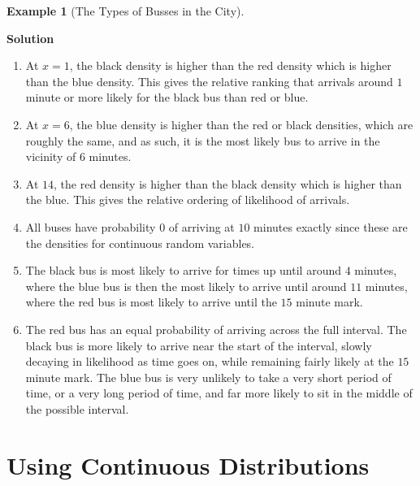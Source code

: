 \documentclass[
  letterpaper,
  DIV=11,
  numbers=noendperiod]{scrreprt}
\providecommand{\tightlist}{%
  \setlength{\itemsep}{0pt}\setlength{\parskip}{0pt}}\usepackage{longtable,booktabs,array}
\theoremstyle{definition}
\theoremstyle{definition}
\newtheorem{example}{Example}[chapter]
\theoremstyle{definition}
\theoremstyle{remark}
\begin{document}
\begin{example}[The Types of Busses in the
City]
\begin{tcolorbox}[enhanced jigsaw, colback=white, colframe=quarto-callout-color-frame, arc=.35mm, leftrule=.75mm, rightrule=.15mm, opacityback=0, breakable, bottomrule=.15mm, left=2mm, toprule=.15mm]
\vspace{-3mm}\textbf{Solution}\vspace{3mm}

\begin{enumerate}
\def\labelenumi{\alph{enumi}.}
\tightlist
\item
  At \(x = 1\), the black density is higher than the red density which
  is higher than the blue density. This gives the relative ranking that
  arrivals around \(1\) minute or more likely for the black bus than red
  or blue.
\item
  At \(x = 6\), the blue density is higher than the red or black
  densities, which are roughly the same, and as such, it is the most
  likely bus to arrive in the vicinity of \(6\) minutes.
\item
  At \(14\), the red density is higher than the black density which is
  higher than the blue. This gives the relative ordering of likelihood
  of arrivals.
\item
  All buses have probability \(0\) of arriving at \(10\) minutes exactly
  since these are the densities for continuous random variables.
\item
  The black bus is most likely to arrive for times up until around \(4\)
  minutes, where the blue bus is then the most likely to arrive until
  around \(11\) minutes, where the red bus is most likely to arrive
  until the \(15\) minute mark.
\item
  The red bus has an equal probability of arriving across the full
  interval. The black bus is more likely to arrive near the start of the
  interval, slowly decaying in likelihood as time goes on, while
  remaining fairly likely at the \(15\) minute mark. The blue bus is
  very unlikely to take a very short period of time, or a very long
  period of time, and far more likely to sit in the middle of the
  possible interval.
\end{enumerate}

\end{tcolorbox}

\end{example}

\section{Using Continuous
Distributions}\label{using-continuous-distributions}
\end{document}
